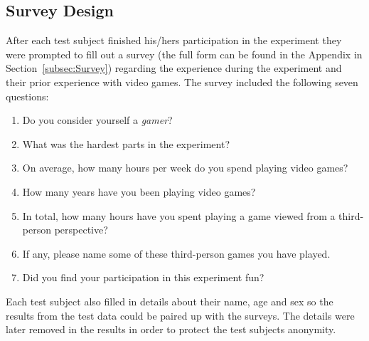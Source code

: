 \documentclass[runningheads,a4paper,oribibl]{llncs}
\begin{document}
\subsection{Survey Design}
After each test subject finished his/hers participation in the experiment they were prompted to fill out a survey (the full form can be found in the Appendix in Section~\ref{subsec:Survey}) regarding the experience during the experiment and their prior experience with video games. The survey included the following seven questions:
\begin{enumerate}
	\item Do you consider yourself a \emph{gamer}?
	\item What was the hardest parts in the experiment?
	\item On average, how many hours per week do you spend playing video games?
	\item How many years have you been playing video games?
	\item In total, how many hours have you spent playing a game viewed from a third-person perspective?
	\item If any, please name some of these third-person games you have played.
	\item Did you find your participation in this experiment fun?
\end{enumerate}
Each test subject also filled in details about their name, age and sex so the results from the test data could be paired up with the surveys. The details were later removed in the results in order to protect the test subjects anonymity.






















\end{document}

